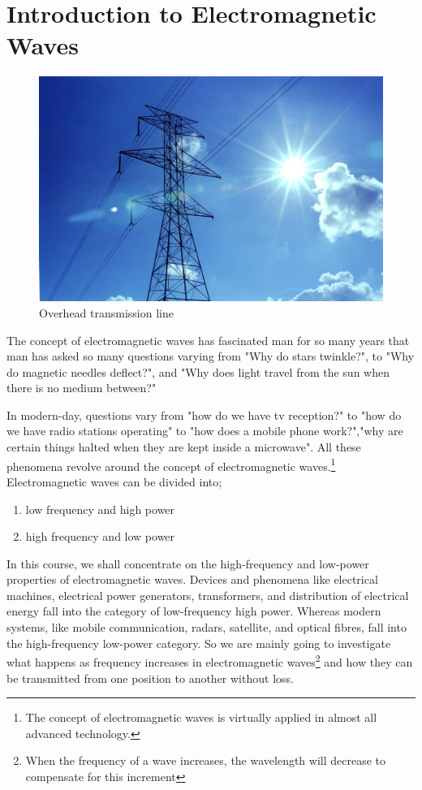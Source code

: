 \chapter{Introduction to Electromagnetic Waves}
\begin{figure}[h]
\centering
\includegraphics[width=1\linewidth]{./graphics/transmission1}
\caption{Overhead transmission line}
\end{figure}


The concept of electromagnetic waves has fascinated man for so many years that man has asked so many questions varying from "Why do stars twinkle?", to "Why do magnetic needles deflect?", and "Why does light travel from the sun when there is no medium between?"\newline

In modern-day, questions vary from "how do we have tv reception?" to "how do we have radio stations operating" to "how does a mobile phone work?","why are certain things halted when they are kept inside a microwave". All these phenomena revolve around the concept of electromagnetic waves.\footnote{The concept of electromagnetic waves is virtually applied in almost all advanced technology.}\\

Electromagnetic waves can be divided into;
\begin{enumerate}
\item low frequency and high power
\item high frequency and low power
\end{enumerate}


In this course, we shall concentrate on the high-frequency and low-power properties of electromagnetic waves. Devices and phenomena like electrical machines, electrical power generators, transformers, and distribution of electrical energy fall into the category of low-frequency high power. Whereas modern systems, like mobile communication, radars, satellite, and optical fibres, fall into the high-frequency low-power category. So we are mainly going to investigate what happens as frequency increases in electromagnetic waves\footnote{When the frequency of a wave increases, the wavelength will decrease to compensate for this increment} and how they can be transmitted from one position to another without loss.\\

